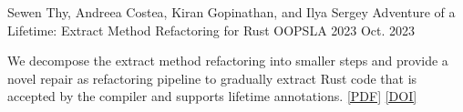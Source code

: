 

\begin{cventries}

  \cventry
    {Sewen Thy, Andreea Costea, Kiran Gopinathan, and Ilya Sergey} %
    {Adventure of a Lifetime: Extract Method Refactoring for Rust} %
    {OOPSLA 2023} %
    {Oct. 2023} %
    {
     \begin{cvitems} %
        \item {We decompose the extract method refactoring into smaller
        steps and provide a novel repair as refactoring pipeline to
        gradually extract Rust code that is accepted by the compiler and
        supports lifetime annotations. \href{https://fastmail-resource.sewenthy.dev/public/academics/rem-oopsla23.pdf}{[PDF]} \href{https://dl.acm.org/doi/10.1145/3622821}{[DOI]}}
     \end{cvitems}
    }

\end{cventries}
